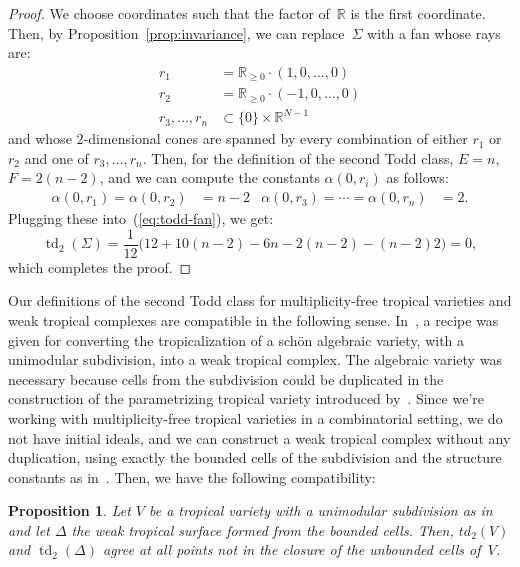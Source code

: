 \documentclass[11pt]{amsart}
\newtheorem{prop}[thm]{Proposition}
\theoremstyle{definition}
\newcommand{\RR}{\mathbb R}
\newcommand{\td}{\operatorname{td}}
\begin{document}
\begin{proof}
We choose coordinates such that the factor of~$\RR$ is the first coordinate.
Then, by Proposition~\ref{prop:invariance}, we can replace~$\Sigma$ with a fan
whose rays are:
\begin{align*}
r_1 &= \RR_{\geq 0} \cdot (1, 0, \ldots, 0) \\
r_2 &= \RR_{\geq 0} \cdot (-1, 0, \ldots, 0) \\
r_3, \ldots, r_n &\subset \{0\} \times \RR^{N-1}
\end{align*}
and whose $2$-dimensional cones are spanned by every combination of either $r_1$
or~$r_2$ and one of $r_3, \ldots, r_n$. Then, for the definition of the second
Todd class, $E = n$, $F= 2(n-2)$, and we can
compute the constants $\alpha(0,r_i)$ as follows:
\begin{align*}
\alpha(0,r_1) = \alpha(0, r_2) &= n-2 &
\alpha(0, r_3) = \cdots = \alpha(0, r_n) &= 2.
\end{align*}
Plugging these into~(\ref{eq:todd-fan}), we get:
\begin{equation*}
\td_2(\Sigma) = \frac{1}{12}
\big(12 + 10 (n-2) - 6 n - 2(n-2) - (n-2) 2\big) = 0,
\end{equation*}
which completes the proof.
\end{proof}

Our definitions of the second Todd class for multiplicity-free tropical
varieties and weak tropical complexes are compatible in the following sense.
In~\cite[Sec.~3]{cartwright-complexes}, a recipe was given for converting the
tropicalization of a sch\"on algebraic variety, with a unimodular subdivision,
into a weak tropical complex. The algebraic variety was necessary because cells
from the subdivision could be duplicated in the construction of the
parametrizing tropical variety introduced by~\cite{helm-katz}. Since we're
working with multiplicity-free tropical varieties in a combinatorial setting, we
do not have initial ideals, and we can construct a weak tropical complex without
any duplication, using exactly the bounded cells of the subdivision and the
structure constants as in~\cite[Const.~3.3]{cartwright-complexes}. Then, we have
the following compatibility:

\begin{prop}\label{prop:todd-compatibility}
Let $V$ be a tropical variety with a unimodular subdivision as
in~\cite[Sec.~3]{cartwright-complexes} and let $\Delta$ the
weak tropical surface formed from the bounded cells. Then, $td_2(V)$ and
$\td_2(\Delta)$ agree at all points not in the closure of the unbounded cells
of~$V$.
\end{prop}
\end{document}
